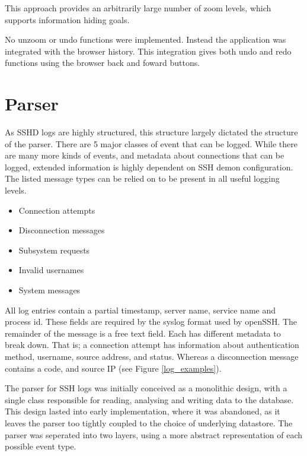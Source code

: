 This approach provides an arbitrarily large number of zoom levels, which supports information hiding goals.

No unzoom or undo functions were implemented. Instead the application was integrated with the browser history. This integration gives both undo and redo functions using the browser back and foward buttons. 

\section{Parser}\label{parser}

As SSHD logs are highly structured, this structure largely dictated the structure of the parser. There are 5 major classes of event that can be logged. While there are many more kinds of events, and metadata about connections that can be logged, extended information is highly dependent on SSH demon configuration. The listed message types can be relied on to be present in all useful logging levels. 
\begin{itemize}
\item{Connection attempts}
\item{Disconnection messages}
\item{Subsystem requests}
\item{Invalid usernames}
\item{System messages}
\end{itemize}

All log entries contain a partial timestamp, server name, service name and process id. These fields are required by the syslog format used by openSSH. The remainder of the message is a free text field. Each has different metadata to break down. That is; a connection attempt has information about authentication method, username, source address, and status. Whereas a disconnection message contains a code, and source IP (see Figure \ref{log_examples}).

The parser for SSH logs was initially conceived as a monolithic design, with a single class responsible for reading, analysing and writing data to the database. This design lasted into early implementation, where it was abandoned, as it leaves the parser too tightly coupled to the choice of underlying datastore. The parser was seperated into two layers, using a more abstract representation of each possible event type.


